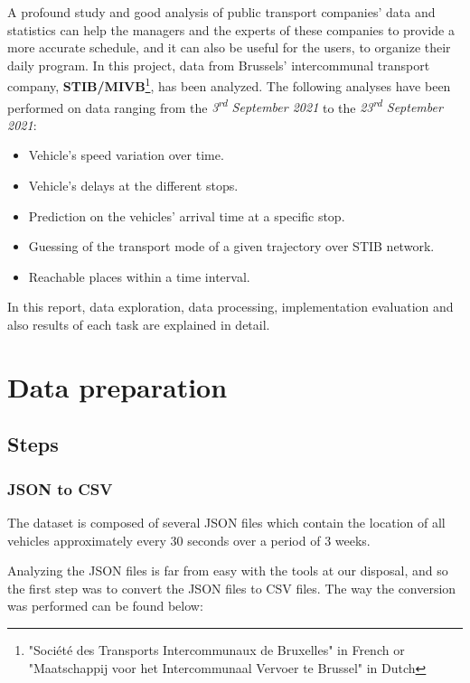 \documentclass{article}
\begin{document}
A profound study and good analysis of public transport companies' data and statistics can help the managers and the experts of these companies to provide a more accurate schedule, and it can also be useful for the users, to organize their daily program. In this project, data from Brussels' intercommunal transport company, \textbf{STIB/MIVB}\footnote{"Société des Transports Intercommunaux de Bruxelles" in French or "Maatschappij voor het Intercommunaal Vervoer te Brussel" in Dutch}, has been analyzed. The following analyses have been performed on data ranging from the \textit{3\textsuperscript{rd} September 2021} to the \textit{23\textsuperscript{rd} September 2021}:
\begin{itemize}
    \item Vehicle's speed variation over time.
    \item Vehicle's delays at the different stops.
    \item Prediction on the vehicles' arrival time at a specific stop.
    \item Guessing of the transport mode of a given trajectory over STIB network.
    \item Reachable places within a time interval.
\end{itemize}

In this report, data exploration, data processing, implementation evaluation and also results of each task are explained in detail.


\section{Data preparation}

\subsection{Steps}
\subsubsection{JSON to CSV}

The dataset is composed of several JSON files which contain the location of all vehicles approximately every 30 seconds over a period of 3 weeks.

Analyzing the JSON files is far from easy with the tools at our disposal, and so the first step was to convert the JSON files to CSV files. The way the conversion was performed can be found below:
\end{document}
